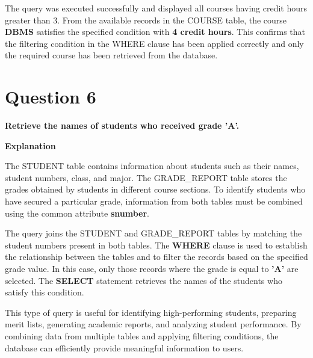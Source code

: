 \documentclass[12pt,a4paper]{report}
\begin{document}
The query was executed successfully and displayed all courses having credit hours greater than 3. From the available records in the COURSE table, the course \textbf{DBMS} satisfies the specified condition with \textbf{4 credit hours}. This confirms that the filtering condition in the WHERE clause has been applied correctly and only the required course has been retrieved from the database.

\newpage


\vspace{-1cm}

\section*{Question 6}

\textbf{Retrieve the names of students who received grade 'A'.}

\vspace{0.4cm}

\textbf{Explanation}

The STUDENT table contains information about students such as their names, student numbers, class, and major. The GRADE\_REPORT table stores the grades obtained by students in different course sections. To identify students who have secured a particular grade, information from both tables must be combined using the common attribute \textbf{snumber}.

The query joins the STUDENT and GRADE\_REPORT tables by matching the student numbers present in both tables. The \textbf{WHERE} clause is used to establish the relationship between the tables and to filter the records based on the specified grade value. In this case, only those records where the grade is equal to \textbf{'A'} are selected. The \textbf{SELECT} statement retrieves the names of the students who satisfy this condition.

This type of query is useful for identifying high-performing students, preparing merit lists, generating academic reports, and analyzing student performance. By combining data from multiple tables and applying filtering conditions, the database can efficiently provide meaningful information to users.
\end{document}
